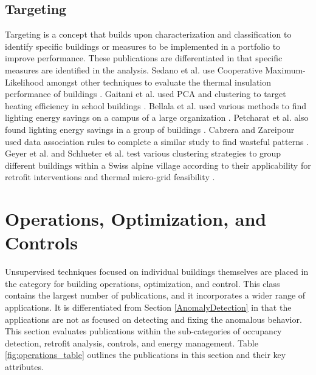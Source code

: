 \documentclass[preprint,12pt,3p]{elsarticle}
\begin{document}
\subsection{Targeting}
Targeting is a concept that builds upon characterization and classification to identify specific buildings or measures to be implemented in a portfolio to improve performance. These publications are differentiated in that specific measures are identified in the analysis. Sedano et al. use Cooperative Maximum-Likelihood amongst other techniques to evaluate the thermal insulation performance of buildings \cite{sedano_improving_2009}. Gaitani et al. used PCA and clustering to target heating efficiency in school buildings \cite{gaitani_using_2010}. Bellala et al. used various methods to find lighting energy savings on a campus of a large organization \cite{bellala_towards_2011}. Petcharat et al. also found lighting energy savings in a group of buildings \cite{petcharat_assessment_2012}. Cabrera and Zareipour used data association rules to complete a similar study to find wasteful patterns \cite{cabrera_data_2013}. Geyer et al.  and Schlueter et al. test various clustering strategies to group different buildings within a Swiss alpine village according to their applicability for retrofit interventions \cite{geyer_application_2016} and thermal micro-grid feasibility \cite{schlueter_analysis_2016}.

\section{Operations, Optimization, and Controls}
\label{Operations}
Unsupervised techniques focused on individual buildings themselves are placed in the category for building operations, optimization, and control. This class contains the largest number of publications, and it incorporates a wider range of applications. It is differentiated from Section \ref{AnomalyDetection} in that the applications are not as focused on detecting and fixing the anomalous behavior. This section evaluates publications within the sub-categories of occupancy detection, retrofit analysis, controls, and energy management. Table \ref{fig:operations_table} outlines the publications in this section and their key attributes.
\end{document}
